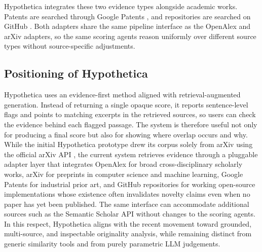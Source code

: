 Hypothetica integrates these two evidence types alongside academic works. Patents are searched through Google Patents \citep{serpapi}, and repositories are searched on GitHub \citep{githubAPI}. Both adapters share the same pipeline interface as the OpenAlex and arXiv adapters, so the same scoring agents reason uniformly over different source types without source-specific adjustments.

\subsection{Positioning of Hypothetica}

Hypothetica uses an evidence-first method aligned with retrieval-augmented generation. Instead of returning a single opaque score, it reports sentence-level flags and points to matching excerpts in the retrieved sources, so users can check the evidence behind each flagged passage. The system is therefore useful not only for producing a final score but also for showing where overlap occurs and why. While the initial Hypothetica prototype drew its corpus solely from arXiv using the official arXiv API \citep{arxivAPI}, the current system retrieves evidence through a pluggable adapter layer that integrates OpenAlex \citep{openalexDocs,priem2022openalex} for broad cross-disciplinary scholarly works, arXiv \citep{arxivAPI} for preprints in computer science and machine learning, Google Patents for industrial prior art, and GitHub repositories for working open-source implementations whose existence often invalidates novelty claims even when no paper has yet been published. The same interface can accommodate additional sources such as the Semantic Scholar API \citep{semanticScholarAPI} without changes to the scoring agents. In this respect, Hypothetica aligns with the recent movement toward grounded, multi-source, and inspectable originality analysis, while remaining distinct from generic similarity tools and from purely parametric LLM judgements.
